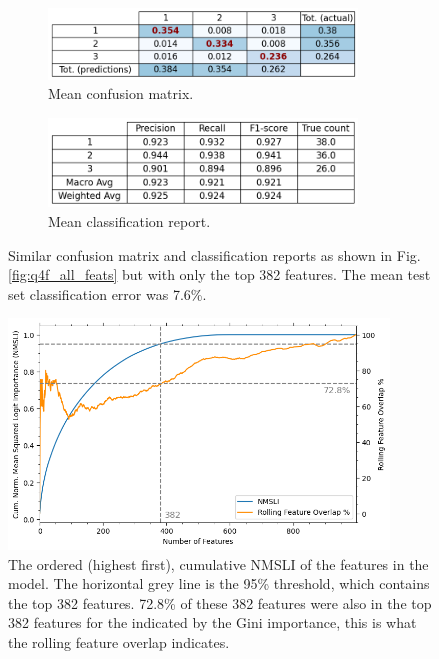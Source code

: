     \begin{figure}[htb]
    \centering
    \begin{subfigure}{0.5\textwidth}
        \centering
        \includegraphics[width=0.9\textwidth]{./figures/q4f_confusion_matrix_reduced_feats}
        \caption{Mean confusion matrix.}
        \label{fig:q4f_confusion_matrix_reduced_feats}
    \end{subfigure}%
    \begin{subfigure}{0.5\textwidth}
        \centering
        \includegraphics[width=0.9\textwidth]{./figures/q4f_classification_report_reduced_feats}
        \caption{Mean classification report.}
        \label{fig:q4f_classification_report_reduced_feats}
    \end{subfigure}
    \caption{Similar confusion matrix and classification reports as shown in Fig. \eqref{fig:q4f_all_feats} but with only
        the top 382 features. The mean test set classification error was 7.6\%.}
    \label{fig:q4f_reduced_feats}
    \end{figure}

    \begin{figure}[htb]
    \centering
    \includegraphics[width=0.9\textwidth]{./figures/q4f_logit_importance}
    \caption{The ordered (highest first), cumulative NMSLI of the features in the  model.
        The horizontal grey line is the 95\% threshold, which contains the top 382 features. 72.8\% of these 382 features
        were also in the top 382 features for the  indicated by the Gini importance,
        this is what the rolling feature overlap indicates.}
        \label{fig:q4f_logit_importance}
    \end{figure}

